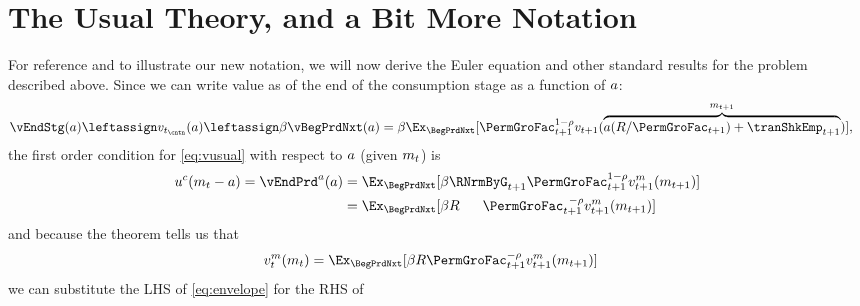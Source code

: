 \documentclass[SolvingMicroDSOPs]{subfiles}
\begin{document}
\hypertarget{the-usual-theory}{}
\section{The Usual Theory, and a Bit More Notation}\label{sec:the-usual-theory}


For reference and to illustrate our new notation, we will now derive the Euler equation and other standard results for the problem described above.
Since we can write value as of the end of the consumption stage as a function of $a$:
\begin{equation*}\begin{gathered}\begin{aligned}
  \vEndStg(\aNrm) & \leftassign \vFunc_{\prd_\cntn}(\aNrm) \leftassign \DiscFac \vBegPrdNxt(\aNrm) = \DiscFac \Ex_{\BegPrdNxt}[\PermGroFac_{\prd+1}^{1-\CRRA}\vFunc_{\prd+1}(\overbrace{a (\Rfree / \PermGroFac_{\prd+1})+\tranShkEmp_{\prd+1}}^{\mNrm_{\prd+1}})],
\end{aligned}\end{gathered}\end{equation*}
the first order condition for \eqref{eq:vusual} with respect to $a$ (given $m_{t}$) is
\begin{equation}\begin{gathered}\begin{aligned}
      \uFunc^{\cNrm}(\mNrm_{\prd}-\aNrm) = \vEndPrd^{\aNrm}(a) & = \Ex_{\BegPrdNxt}[\DiscFac \RNrmByG_{\prd+1}\PermGroFac_{\prd+1}^{1-\CRRA}{\vFunc}^\mNrm_{\prd+1}(\mNrm_{\prd+1})]  \label{eq:upceqEvtp1}
      \\                        & =  \Ex_{\BegPrdNxt}[\DiscFac\Rfree\phantom{._{\prd+1}}\PermGroFac_{\prd+1}^{\phantom{1}-\CRRA}{\vFunc}^{\mNrm}_{\prd+1}(\mNrm_{\prd+1})]
    \end{aligned}\end{gathered}\end{equation}
and because the  theorem tells us that
\begin{equation}\begin{gathered}\begin{aligned}
      {\vFunc}^{\mNrm}_{\prd}(\mNrm_{\prd})  & =  \Ex_{\BegPrdNxt} [\DiscFac \Rfree \PermGroFac_{\prd+1}^{-\CRRA}{\vFunc}^{\mNrm}_{\prd+1}(\mNrm_{\prd+1})] \label{eq:envelope}
    \end{aligned}\end{gathered}\end{equation}
we can substitute the LHS of \eqref{eq:envelope} for the RHS of
\end{document}
